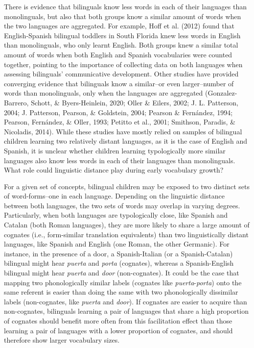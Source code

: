 \documentclass[
  english,
  man,man,floatsintext]{apa6}
\begin{document}
There is evidence that bilinguals know less words in each of their languages than monolinguals, but also that both groups know a similar amount of words when the two languages are aggregated. For example, Hoff et al. (2012) found that English-Spanish bilingual toddlers in South Florida knew less words in English than monolinguals, who only learnt English. Both groups knew a similar total amount of words when both English and Spanish vocabularies were counted together, pointing to the importance of collecting data on both languages when assessing bilinguals' communicative development. Other studies have provided converging evidence that bilinguals know a similar--or even larger--number of words than monolinguals, only when the languages are aggregated (Gonzalez-Barrero, Schott, \& Byers-Heinlein, 2020; Oller \& Eilers, 2002; J. L. Patterson, 2004; J. Patterson, Pearson, \& Goldstein, 2004; Pearson \& Fernández, 1994; Pearson, Fernández, \& Oller, 1993; Petitto et al., 2001; Smithson, Paradis, \& Nicoladis, 2014). While these studies have mostly relied on samples of bilingual children learning two relatively distant languages, as it is the case of English and Spanish, it is unclear whether children learning typologically more similar languages also know less words in each of their languages than monolinguals. What role could linguistic distance play during early vocabulary growth?

For a given set of concepts, bilingual children may be exposed to two distinct sets of word-forms--one in each language. Depending on the linguistic distance between both languages, the two sets of words may overlap in varying degrees. Particularly, when both languages are typologically close, like Spanish and Catalan (both Roman languages), they are more likely to share a large amount of cognates (i.e., form-similar translation equivalents) than two linguistically distant languages, like Spanish and English (one Roman, the other Germanic). For instance, in the presence of a door, a Spanish-Italian (or a Spanish-Catalan) bilingual might hear \emph{puerta} and \emph{porta} (cognates), whereas a Spanish-English bilingual might hear \emph{puerta} and \emph{door} (non-cognates). It could be the case that mapping two phonologically similar labels (cognates like \emph{puerta}-\emph{porta}) onto the same referent is easier than doing the same with two phonologically dissimilar labels (non-cognates, like \emph{puerta} and \emph{door}). If cognates are easier to acquire than non-cognates, bilinguals learning a pair of languages that share a high proportion of cognates should benefit more often from this facilitation effect than those learning a pair of languages with a lower proportion of cognates, and should therefore show larger vocabulary sizes.
\end{document}
